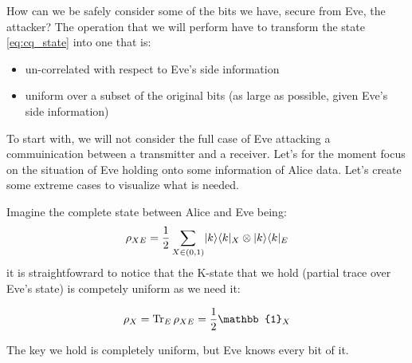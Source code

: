 How can we be safely consider some of the bits we have, secure from Eve, the attacker? The operation that we will perform have to transform the state \ref{eq:cq_state} into one that is:

\begin{itemize}
\item un-correlated with respect to  Eve's side information \\
\item uniform over a subset of the original bits (as large as possible, given Eve's side information)
\end{itemize}

To start with, we will not consider the full case of Eve attacking a commuinication between a transmitter and a receiver. Let's for the moment focus on the situation of Eve holding onto some information of Alice data.
Let's create some extreme cases to visualize what is needed.

\begin{example}
	Imagine the complete state between Alice and Eve being:
	\begin{equation}
		\rho_{XE}= \frac{1}{2} \sum_{X \in (0,1)} \lvert k\rangle\langle k\rvert_X \otimes \lvert k\rangle\langle k\rvert_E
		\label{eq:Eveknowseverything}
	\end{equation}
	it is straightfowrard to notice that the K-state that we hold (partial trace over Eve's state) is competely uniform as we need it:

	\begin{equation}
		\rho_X = \Tr_E \rho_{XE} = \frac{1}{2} \mathbb{1}_X
	\end{equation}

	The key we hold is completely uniform, but Eve knows every bit of it.
\end{example}

